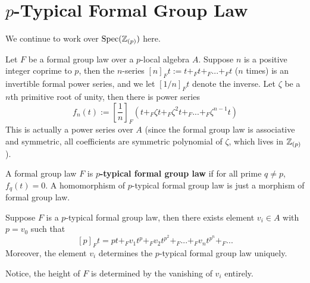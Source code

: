 \section{$p$-Typical Formal Group Law}\label{sec:formalgroups-typicalFormalGroup}

    We continue to work over $\operatorname{\mathrm{Spec}}(\mathbb{Z}_{(p)})$ here.

    Let $F$ be a formal group law over a $p$-local algebra $A$. Suppose $n$ is a positive integer coprime to $p$, then the $n$-series $[n]_Ft:=t+_Ft+_F...+_F t$ ($n$ times) is an invertible formal power series, and we let $[1/n]_F t$ denote the inverse. Let $\zeta$ be a $n$th primitive root of unity, then there is power series
    \[
    f_n(t):=[\frac{1}{n}]_F (t+_F \zeta t+_F \zeta^2 t+_F...+_F \zeta^{n-1}t)
    \]This is actually a power series over $A$ (since the formal group law is associative and symmetric, all coefficients are symmetric polynomial of $\zeta$, which lives in $\mathbb{Z}_{(p)}$).
\begin{definition}
    A formal group law $F$ is \textbf{$p$-typical formal group law} if for all prime $q\neq p$, $f_q(t)=0$. A homomorphism of $p$-typical formal group law is just a morphism of formal group law.
\end{definition}


\begin{remark}
    Suppose $F$ is a $p$-typical formal group law, then there exists element $v_i \in A$ with $p=v_0$ such that 
    \[
    [p]_F t=pt+_F v_1t^{p}+_F v_2t^{p^2}+_F...+_F v_nt^{p^n}+_F...
    \]
    Moreover, the element $v_i$ determines the $p$-typical formal group law uniquely.

    Notice, the height of $F$ is determined by the vanishing of $v_i$ entirely.
\end{remark}

